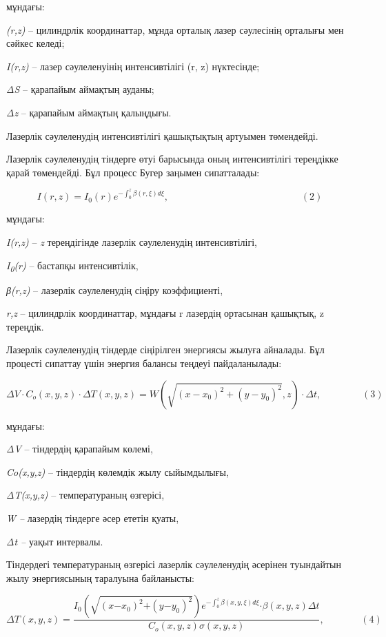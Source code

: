 \begin{multicols}{2}
мұндағы:

\emph{(r,z)} -- цилиндрлік координаттар, мұнда орталық лазер сәулесінің
орталығы мен сәйкес келеді;

\emph{I(r,z)} -- лазер сәулеленуінің интенсивтілігі (r, z) нүктесінде;

\emph{ΔS} -- қарапайым аймақтың ауданы;

\emph{Δz} -- қарапайым аймақтың қалыңдығы.

Лазерлік сәулеленудің интенсивтілігі қашықтықтың артуымен төмендейді.

Лазерлік сәулеленудің тіндерге өтуі барысында оның интенсивтілігі
тереңдікке қарай төмендейді. Бұл процесс Бугер заңымен сипатталады:

\[I(r,z) = I_{0}(r)e^{- \int_{0}^{z}{\beta(r,\xi)d\xi}},\ \ \ \ \ \ \ \ \ \ \ \ \ \ \ \ \ \ \ \ \ \ \ \ \ \ \ \ \ \ \ \ \ \ \ \ \ \ \ \ \ \ \ \ \ \ \ \ \ \ \ \ \ \ \ \ \ \ \ \ \ \ (2)\]

мұндағы:

\emph{I(r,z)} -- \emph{z} тереңдігінде лазерлік сәулеленудің
интенсивтілігі,

\emph{I\textsubscript{0}(r)} -- бастапқы интенсивтілік,

\emph{β(r,z)} -- лазерлік сәулеленудің сіңіру коэффициенті,

\emph{r,z} -- цилиндрлік координаттар, мұндағы r лазердің ортасынан
қашықтық, z тереңдік.

Лазерлік сәулеленудің тіндерде сіңірілген энергиясы жылуға айналады. Бұл
процесті сипаттау үшін энергия балансы теңдеуі пайдаланылады:

\[\Delta V \cdot C_{o}(x,y,z) \cdot \Delta T(x,y,z) = W\left( \sqrt{\left( x - x_{0} \right)^{2} + \left( y - y_{0} \right)^{2}},z \right) \cdot \Delta t,\ \ \ \ \ \ \ \ \ \ \ \ \ \ \ \ \ \ \ (3)\]

мұндағы:

\emph{ΔV} -- тіндердің қарапайым көлемі,

\emph{Co(x,y,z)} -- тіндердің көлемдік жылу сыйымдылығы,

\emph{ΔT(x,y,z)} -- температураның өзгерісі,

\emph{W --} лазердің тіндерге әсер ететін қуаты,

\emph{Δt --} уақыт интервалы.

Тіндердегі температураның өзгерісі лазерлік сәулеленудің әсерінен
туындайтын жылу энергиясының таралуына байланысты:

\[\Delta T(x,y,z) = \frac{I_{0}\left( \sqrt{\left( x\mathbf{-}x_{0} \right)^{2}\mathbf{+}\left( y\mathbf{-}y_{0} \right)^{2}} \right)e^{- \int_{0}^{z}{\beta(x,y,\xi)d\xi}}\mathbf{\cdot}\beta(x,y,z)\Delta t}{C_{o}(x,y,z)\sigma(x,y,z)},\ \ \ \ \ \ \ \ \ \ \ \ \ \ \ \ \ (4)\]


\end{multicols}
